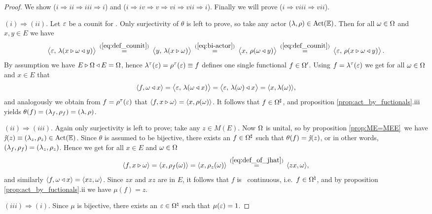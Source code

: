 \begin{proof}
   We show ($i\Rightarrow ii\Rightarrow iii\Rightarrow i$)
   and \mbox{($i\Rightarrow iv\Rightarrow v\Rightarrow vi\Rightarrow vii\Rightarrow i$)}\@.
   Finally we will prove ($i\Rightarrow viii\Rightarrow  vii$).
\vspace{1ex}

   $(i) \Rightarrow (ii)$\@.
   Let $\varepsilon$ be a counit for \EE.  Only surjectivity of $\theta$ is left to prove,
   so take any actor $(\lambda,\rho)\in \mbox{\rm Act}(\mathbb{E})$.
   Then for all $\omega\in \Omega$ and $x,y \in E$ we have
   $$       \pairM{\eps}{\lam(x \lact \om \ract y)}
      \:\stackrel{\rm  (\ref{eq:def_counit})}{=}\:
            \pairM{y}{\lam(x \lact \om)}
      \:\stackrel{\rm  (\ref{eq:bi-actor})}{=}\:
            \pairM{x}{\rho(\om \ract y)}
      \:\stackrel{\rm  (\ref{eq:def_counit})}{=}\:
            \pairM{\eps}{\rho(x \lact \om \ract y)}. $$
   By assumption we have $E \triangleright \Omega \triangleleft E = \Omega$, hence
   $\lambda^\tau(\varepsilon) = \rho^\tau(\varepsilon) \equiv f$ defines one single functional $f\in\Omega'$.
   Using $f = \lambda^\tau(\varepsilon)$ we get for all $\omega\in \Omega$ and $x \in E$ that
   $$  \pair{f}{\om\ract x}
               = \pairM{\eps}{\lam(\om \ract x)}
               = \pairM{\eps}{\lam(\om)\ract x}
               = \pair{x}{\lam(\om)}, $$
   and analogously we obtain from $f=\rho^\tau(\varepsilon)$ that
   $\langle f,x \triangleright \omega \rangle = \langle x,\rho(\omega) \rangle$.
   It follows that $f\in\Omega^\sharp$, and proposition \ref{prop:act_by_fuctionals}.iii
   yields $\theta(f) = (\lambda_f,\rho_f) = (\lambda,\rho)$.
\vspace{1ex}

   $(ii) \Rightarrow (iii)$\@.
   Again only surjectivity is left to prove;
   take any $z\in M(E)$. Now $\Omega$ is unital, so by proposition
   \ref{prop:ME=MEE}\ we have $\jhat(z)\equiv\lamrho{z}\in \ActE$.
   Since $\theta$ is assumed to be bijective,
   there exists an $f\in \Omega^\sharp$ such that $\theta(f) = \jhat(z)$,
   or in other words, $(\lambda_f,\rho_f) = (\lambda_z,\rho_z)$.
   Hence we get for all $x\in E$ and $\omega \in \Omega$
   $$ \langle f,x\triangleright\omega \rangle
            = \langle x,\rho_f(\omega) \rangle
            = \langle x,\rho_z(\omega) \rangle
        \,\stackrel{(\ref{eq:def_of_jhat})}{=}\,
              \langle zx,\omega \rangle, $$
   and similarly $\langle f,\omega\triangleleft x \rangle = \langle xz,\omega \rangle$.
   Since $zx$ and $xz$ are in $E$, it follows that $f$ is
   \strictm\ continuous, i.e.\ $f \in \Omega^\natural$,
   and by proposition \ref{prop:act_by_fuctionals}.ii we have $\mu(f)=z$.
\vspace{1ex}

  $(iii) \Rightarrow (i)$\@.
  Since $\mu$ is bijective, there exists an $\varepsilon\in\Omega^\natural$ such that $\mu(\varepsilon)=1$.
\vspace{1ex}


\end{proof}
